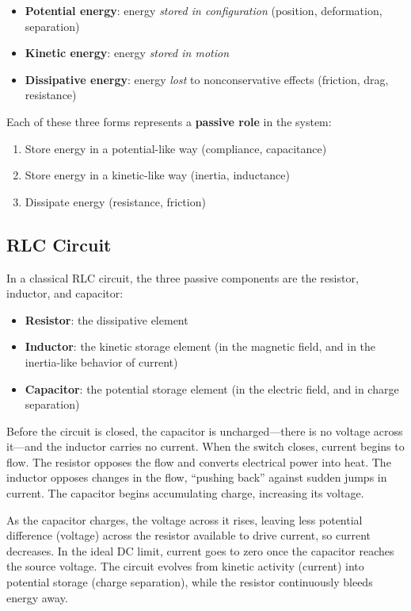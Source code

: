 \documentclass[
  letterpaper,
  DIV=11,
  numbers=noendperiod]{scrartcl}
\providecommand{\tightlist}{%
  \setlength{\itemsep}{0pt}\setlength{\parskip}{0pt}}
\begin{document}
\begin{itemize}
\tightlist
\item
  \textbf{Potential energy}: energy \emph{stored in configuration}
  (position, deformation, separation)
\item
  \textbf{Kinetic energy}: energy \emph{stored in motion}
\item
  \textbf{Dissipative energy}: energy \emph{lost} to nonconservative
  effects (friction, drag, resistance)
\end{itemize}

Each of these three forms represents a \textbf{passive role} in the
system:

\begin{enumerate}
\def\labelenumi{\arabic{enumi}.}
\tightlist
\item
  Store energy in a potential-like way (compliance, capacitance)
\item
  Store energy in a kinetic-like way (inertia, inductance)
\item
  Dissipate energy (resistance, friction)
\end{enumerate}

\subsection{RLC Circuit}\label{rlc-circuit}

In a classical RLC circuit, the three passive components are the
resistor, inductor, and capacitor:

\begin{itemize}
\tightlist
\item
  \textbf{Resistor}: the dissipative element
\item
  \textbf{Inductor}: the kinetic storage element (in the magnetic field,
  and in the inertia-like behavior of current)
\item
  \textbf{Capacitor}: the potential storage element (in the electric
  field, and in charge separation)
\end{itemize}

Before the circuit is closed, the capacitor is uncharged---there is no
voltage across it---and the inductor carries no current. When the switch
closes, current begins to flow. The resistor opposes the flow and
converts electrical power into heat. The inductor opposes changes in the
flow, ``pushing back'' against sudden jumps in current. The capacitor
begins accumulating charge, increasing its voltage.

As the capacitor charges, the voltage across it rises, leaving less
potential difference (voltage) across the resistor available to drive
current, so current decreases. In the ideal DC limit, current goes to
zero once the capacitor reaches the source voltage. The circuit evolves
from kinetic activity (current) into potential storage (charge
separation), while the resistor continuously bleeds energy away.
\end{document}
